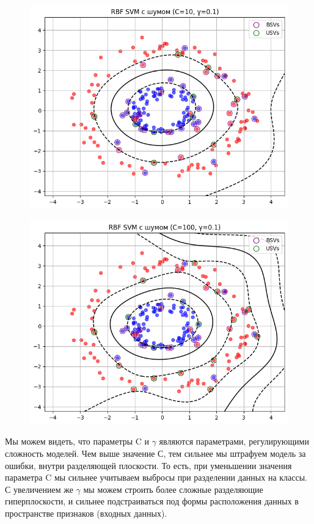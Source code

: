 \begin{enumerate}
\begin{figure}[H]
        \centering
        \includegraphics[width=0.75\linewidth]{assets/4.3.png}
        \caption {}
    \end{figure}
    \begin{figure}[H]
        \centering
        \includegraphics[width=0.75\linewidth]{assets/4.4.png}
        \caption {}
    \end{figure}

Мы можем видеть, что параметры C и $\gamma$ являются параметрами, регулирующими сложность моделей. Чем выше значение С, тем сильнее мы штрафуем модель за ошибки, внутри разделяющей плоскости. То есть, при уменьшении значения параметра C мы сильнее учитываем выбросы при разделении данных на классы. С увеличением же $\gamma$ мы можем строить более сложные разделяющие гиперплоскости, и сильнее подстраиваться под формы расположения данных в пространстве признаков (входных данных).



\end{enumerate}
